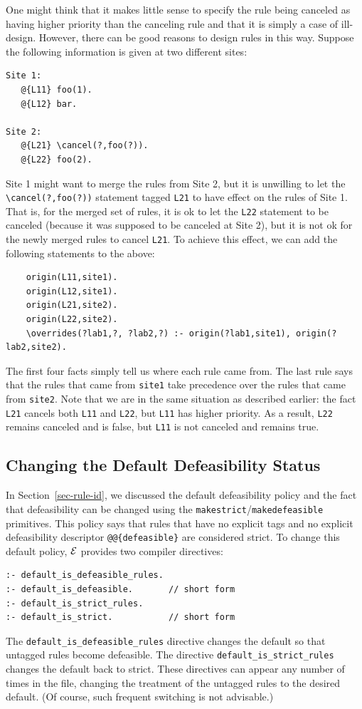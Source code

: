 \documentclass[11pt]{article}
\newcommand{\ERGO}{\mbox{\ensuremath{\cal{E}}\smaller{{\sc{RGO}}}}\xspace}
\newcommand{\FLSYSTEM}{\ERGO}
\newcommand{\bs}{\textbackslash}
\begin{document}
One might think that it makes little sense to specify the rule being
canceled as having higher priority than the canceling rule and that it is
simply a case of ill-design. However, there can be good reasons to design
rules in this way. Suppose the following information is given at two different sites:
\begin{verbatim}
Site 1:
   @{L11} foo(1).
   @{L12} bar.

Site 2:
   @{L21} \cancel(?,foo(?)).  
   @{L22} foo(2).
\end{verbatim}
Site 1 might want to merge the rules from Site 2, but it is unwilling to
let the {\tt \bs{}cancel(?,foo(?))} statement tagged {\tt L21} to have effect
on the rules of Site 1. That is, for the merged set of rules, it is ok to
let the {\tt L22} statement to be canceled (because it was supposed to be
canceled at Site 2), but it is not ok for the newly merged rules to cancel
{\tt L21}. To achieve this effect, we can add the following statements to
the above:
\begin{verbatim}
    origin(L11,site1).
    origin(L12,site1).
    origin(L21,site2).
    origin(L22,site2).
    \overrides(?lab1,?, ?lab2,?) :- origin(?lab1,site1), origin(?lab2,site2).
\end{verbatim}
The first four facts simply tell us where each rule came from.  The
last rule says that the rules that came from {\tt site1} take precedence
over the rules that came from {\tt site2}.  Note that we are in the same
situation as described earlier: the fact {\tt L21} cancels both {\tt L11}
and {\tt L22}, but {\tt L11} has higher priority. As a result, {\tt L22}
remains canceled and is false, but {\tt L11} is not canceled and remains
true.

\subsection{Changing  the Default Defeasibility Status}

In Section~\ref{sec-rule-id}, we discussed the default
defeasibility policy and the fact that defeasibility can be changed using
the \texttt{makestrict}/\texttt{makedefeasible} primitives.  
This policy says that rules that have no explicit tags and no explicit
defeasibility descriptor \texttt{@@\{defeasible\}}  are considered strict. To change this default
policy, \FLSYSTEM provides two compiler directives:
\begin{verbatim}
:- default_is_defeasible_rules.
:- default_is_defeasible.       // short form
:- default_is_strict_rules.
:- default_is_strict.           // short form
\end{verbatim}
The \verb|default_is_defeasible_rules| directive changes the default so
that untagged rules become defeasible. The directive
\verb|default_is_strict_rules| changes the default back to strict.
These directives can appear any number of times in the file,
changing the treatment of the untagged rules to the desired default.
(Of course, such frequent switching is not advisable.)
\end{document}
